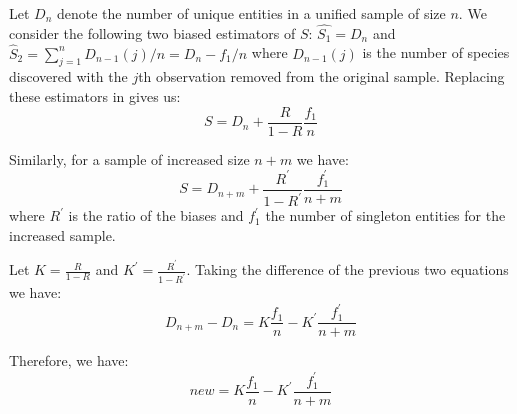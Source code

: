\documentclass{vldb}
\begin{document}
Let $D_n$ denote the number of unique entities in a unified sample of size $n$. We consider the following two biased estimators of $S$: $\hat{S_1} = D_n$ and $\hat{S}_2 = \sum_{j=1}^n D_{n-1}(j)/n = D_n - f_1/n$ where $D_{n-1}(j)$ is the number of species discovered with the $j$th observation removed from the original sample. Replacing these estimators in  gives us:
\begin{equation}
S = D_n +\frac{R}{1-R}\frac{f_1}{n}
\end{equation}

Similarly, for a sample of increased size $n+m$ we have:
\begin{equation}
S = D_{n+m} +\frac{R^{\prime}}{1-R^{\prime}}\frac{f^{\prime}_1}{n+m}
\end{equation}
where $R^{\prime}$ is the ratio of the biases and $f^{\prime}_1$ the number of singleton entities for the increased sample.

Let $K = \frac{R}{1-R}$ and $K^{\prime} = \frac{R^{\prime}}{1-R^{\prime}}$. Taking the difference of the previous two equations we have:
\begin{equation}
D_{n+m} - D_{n} = K\frac{f_1}{n} - K^{\prime}\frac{f^{\prime}_1}{n+m}
\end{equation}

Therefore, we have:
\begin{equation}
\label{eq:new}
new = K\frac{f_1}{n} - K^{\prime}\frac{f^{\prime}_1}{n+m}
\end{equation}
\end{document}
